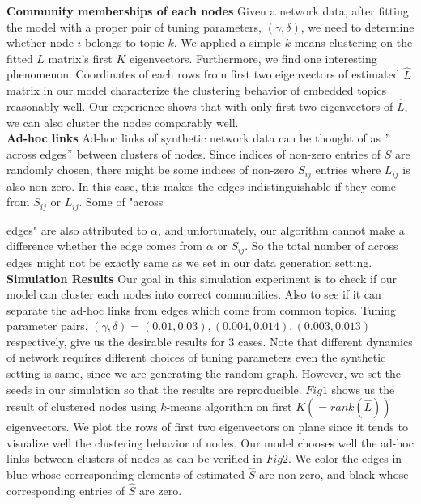 \documentclass{article}
\begin{document}
\noindent \textbf{Community memberships of each nodes} Given a network data, after fitting the model with a proper pair of tuning parameters, $(\gamma,\delta)$, we need to determine whether node $i$ belongs to topic $k$. We applied a simple $k$-means clustering on the fitted $L$ matrix's first $K$ eigenvectors. Furthermore, we find one interesting phenomenon. Coordinates of each rows from first two eigenvectors of estimated $\hat{L}$ matrix in our model characterize the clustering behavior of embedded topics reasonably well. Our experience shows that with only first two eigenvectors of $\hat{L}$, we can also cluster the nodes comparably well. \\

\noindent \textbf{Ad-hoc links} Ad-hoc links of synthetic network data can be thought of as $"$across edges$"$ between clusters of nodes. Since indices of non-zero entries of $S$ are randomly chosen, there might be some indices of non-zero $S_{ij}$ entries where $L_{ij}$ is also non-zero. In this case, this makes the edges indistinguishable if they come from $S_{ij}$ or $L_{ij}$. Some of "across

\noindent edges" are also attributed to $\alpha$, and unfortunately, our algorithm cannot make a difference whether the edge comes from $\alpha$ or $S_{ij}$. So the total number of across edges might not be exactly same as we set in our data generation setting. \\

\noindent \textbf{Simulation Results} Our goal in this simulation experiment is to check if our model can cluster each nodes into correct communities. Also to see if it can separate the ad-hoc links from edges which come from common topics. Tuning parameter pairs, $(\gamma,\delta) = (0.01,0.03),(0.004,0.014),(0.003,0.013)$ respectively, give us the desirable results for 3 cases. Note that different dynamics of network requires different choices of tuning parameters even the synthetic setting is same, since we are generating the random graph. However, we set the seeds in our simulation so that the results are reproducible. $Fig1$ shows us the result of clustered nodes using $k$-means algorithm on first $K(=rank(\hat{L}))$ eigenvectors. We plot the rows of first two eigenvectors on plane since it tends to visualize well the clustering behavior of nodes. Our model chooses well the ad-hoc links between clusters of nodes as can be verified in $Fig2$. We color the edges in blue whose corresponding elements of estimated $\hat{S}$ are non-zero, and black whose corresponding entries of $\hat{S}$ are zero.
\end{document}
